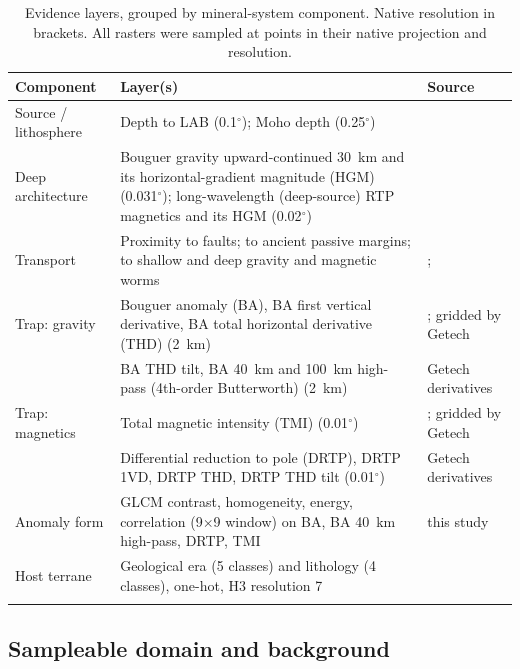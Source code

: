 \documentclass[pdflatex,sn-apa]{sn-jnl}
\begin{document}
\begin{table}[t]
\caption{Evidence layers, grouped by mineral-system component. Native resolution in brackets. All rasters were sampled at points in their native projection and resolution.}\label{tab:layers}
\footnotesize
\begin{tabular*}{\textwidth}{@{\extracolsep\fill}p{2.4cm}p{5.6cm}p{3.5cm}}
\toprule
Component & Layer(s) & Source \\
\midrule
Source / lithosphere & Depth to LAB (0.1$^\circ$); Moho depth (0.25$^\circ$) & \citet{McCafferty2023} \\
Deep architecture & Bouguer gravity upward-continued 30~km and its horizontal-gradient magnitude (HGM) (0.031$^\circ$); long-wavelength (deep-source) RTP magnetics and its HGM (0.02$^\circ$) & \citet{McCafferty2023} \\
Transport & Proximity to faults; to ancient passive margins; to shallow and deep gravity and magnetic worms & \citet{McCafferty2023}; \citet{BradleyDC2008} \\
Trap: gravity & Bouguer anomaly (BA), BA first vertical derivative, BA total horizontal derivative (THD) (2~km) & \citet{Jobin2017}; gridded by Getech \\
 & BA THD tilt, BA 40~km and 100~km high-pass (4th-order Butterworth) (2~km) & Getech derivatives \\
Trap: magnetics & Total magnetic intensity (TMI) (0.01$^\circ$) & \citet{Miles2016}; gridded by Getech \\
 & Differential reduction to pole (DRTP), DRTP 1VD, DRTP THD, DRTP THD tilt (0.01$^\circ$) & Getech derivatives \\
Anomaly form & GLCM contrast, homogeneity, energy, correlation (9$\times$9 window) on BA, BA 40~km high-pass, DRTP, TMI & this study \\
Host terrane & Geological era (5 classes) and lithology (4 classes), one-hot, H3 resolution 7 & \citet{Wheeler1996} \\
\botrule
\end{tabular*}
\end{table}

\subsection{Sampleable domain and background}\label{sec:domain}
\end{document}
